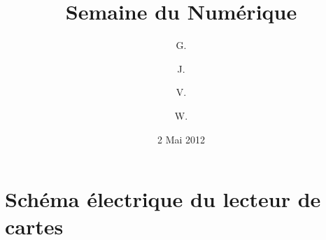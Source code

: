 \documentclass{book}
\title{Semaine du Numérique}
\author{
   G. \bsc{Guisez}
   \and
   J. \bsc{Hennani}
   \and
   V. \bsc{Hiairrassary}
   \and
   W. \bsc{Tassoux}
}
\date{2 Mai 2012}
\begin{document}
    \setlength{\parskip}{0.1in}

    \pagestyle{empty}

    \renewcommand{\maketitlehookd}
    {
        \vspace{8cm}

        Une formation à la carte va être proposée à Polytech Montpellier ce qui 
        implique de gérer les inscriptions, les demandes de ressource, les accès
        aux salles et l'évaluation des participants. Une solution alliant 
        informatique et électronique est pressentie. 
    }

\frontmatter
    \maketitle
    \tableofcontents

    

\mainmatter
    
    
    

\appendix
    \chapter{Schéma électrique du lecteur de cartes}

\backmatter
    
    

    
    
\end{document}
